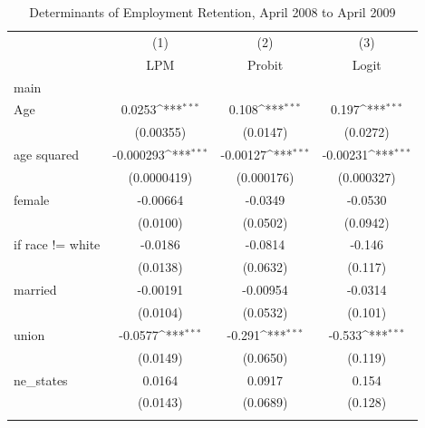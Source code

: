 \begin{table}[htbp]\centering
\def\sym#1{\ifmmode^{#1}\else\(^{#1}\)\fi}
\caption{Determinants of Employment Retention, April 2008 to April 2009\label{tab:prob1-full}}
\begin{tabular}{l*{3}{c}}
\toprule
                    &\multicolumn{1}{c}{(1)}&\multicolumn{1}{c}{(2)}&\multicolumn{1}{c}{(3)}\\
                    &\multicolumn{1}{c}{LPM}&\multicolumn{1}{c}{Probit}&\multicolumn{1}{c}{Logit}\\
\midrule
main                &                     &                     &                     \\
Age                 &      0.0253\sym{***}&       0.108\sym{***}&       0.197\sym{***}\\
                    &   (0.00355)         &    (0.0147)         &    (0.0272)         \\
\addlinespace
age squared         &   -0.000293\sym{***}&    -0.00127\sym{***}&    -0.00231\sym{***}\\
                    & (0.0000419)         &  (0.000176)         &  (0.000327)         \\
\addlinespace
female              &    -0.00664         &     -0.0349         &     -0.0530         \\
                    &    (0.0100)         &    (0.0502)         &    (0.0942)         \\
\addlinespace
=1 if race != white &     -0.0186         &     -0.0814         &      -0.146         \\
                    &    (0.0138)         &    (0.0632)         &     (0.117)         \\
\addlinespace
married             &    -0.00191         &    -0.00954         &     -0.0314         \\
                    &    (0.0104)         &    (0.0532)         &     (0.101)         \\
\addlinespace
union               &     -0.0577\sym{***}&      -0.291\sym{***}&      -0.533\sym{***}\\
                    &    (0.0149)         &    (0.0650)         &     (0.119)         \\
\addlinespace
ne\_states           &      0.0164         &      0.0917         &       0.154         \\
                    &    (0.0143)         &    (0.0689)         &     (0.128)         \\
\addlinespace

\end{tabular}
\end{table}
